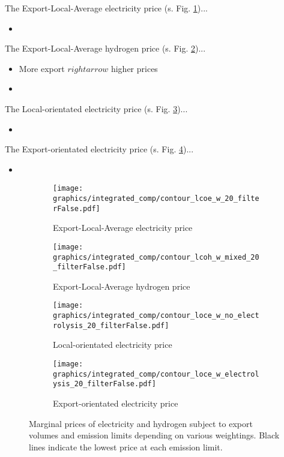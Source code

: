 The Export-Local-Average electricity price (s. Fig. \ref{fig:export_local_el_price})...
\begin{itemize}
    \item 
\end{itemize}

The Export-Local-Average hydrogen price (s. Fig. \ref{fig:export_local_hy_price})...
\begin{itemize}
    \item More export $rightarrow$ higher prices
    \item 
\end{itemize}

The Local-orientated electricity price (s. Fig. \ref{fig:local_el_price})...
\begin{itemize}
    \item 
\end{itemize}

The Export-orientated electricity price (s. Fig. \ref{fig:export_el_price})...
\begin{itemize}
    \item 
\end{itemize}




\begin{figure*}[t] %
    \centering
    \begin{subfigure}[b]{0.45\linewidth}
        \centering
        \texttt{[image: graphics/integrated\_comp/contour\_lcoe\_w\_20\_filterFalse.pdf]}
        \caption{Export-Local-Average electricity price}
        \label{fig:export_local_el_price}
    \end{subfigure}
    \hfill
    \begin{subfigure}[b]{0.45\linewidth}
        \centering
        \texttt{[image: graphics/integrated\_comp/contour\_lcoh\_w\_mixed\_20\_filterFalse.pdf]}
        \caption{Export-Local-Average hydrogen price}
        \label{fig:export_local_hy_price}
    \end{subfigure}
    \hfill
    \begin{subfigure}[b]{0.45\linewidth}
        \centering
        \texttt{[image: graphics/integrated\_comp/contour\_loce\_w\_no\_electrolysis\_20\_filterFalse.pdf]}
        \caption{Local-orientated electricity price}
        \label{fig:local_el_price}
    \end{subfigure}
    \hfill
    \begin{subfigure}[b]{0.45\linewidth}
        \centering
        \texttt{[image: graphics/integrated\_comp/contour\_loce\_w\_electrolysis\_20\_filterFalse.pdf]}
        \caption{Export-orientated electricity price}
        \label{fig:export_el_price}
    \end{subfigure}
    \hfill

    \caption{Marginal prices of electricity and hydrogen subject to export volumes and emission limits depending on various weightings. Black lines indicate the lowest price at each emission limit.}
    \label{fig:marginal_prices}
\end{figure*}



